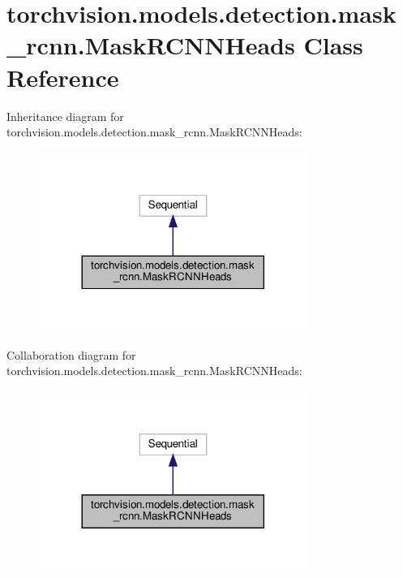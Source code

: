 \hypertarget{classtorchvision_1_1models_1_1detection_1_1mask__rcnn_1_1MaskRCNNHeads}{}\section{torchvision.\+models.\+detection.\+mask\+\_\+rcnn.\+Mask\+R\+C\+N\+N\+Heads Class Reference}
\label{classtorchvision_1_1models_1_1detection_1_1mask__rcnn_1_1MaskRCNNHeads}


Inheritance diagram for torchvision.\+models.\+detection.\+mask\+\_\+rcnn.\+Mask\+R\+C\+N\+N\+Heads\+:
\nopagebreak
\begin{figure}[H]
\begin{center}
\leavevmode
\includegraphics[width=248pt]{classtorchvision_1_1models_1_1detection_1_1mask__rcnn_1_1MaskRCNNHeads__inherit__graph}
\end{center}
\end{figure}


Collaboration diagram for torchvision.\+models.\+detection.\+mask\+\_\+rcnn.\+Mask\+R\+C\+N\+N\+Heads\+:
\nopagebreak
\begin{figure}[H]
\begin{center}
\leavevmode
\includegraphics[width=248pt]{classtorchvision_1_1models_1_1detection_1_1mask__rcnn_1_1MaskRCNNHeads__coll__graph}
\end{center}
\end{figure}
